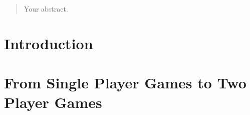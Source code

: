 \documentclass[12pt,twoside]{report}
\date{September 2017}
\begin{document}



\clearpage{\pagestyle{empty}\cleardoublepage}
\setcounter{page}{1}
\pagestyle{fancy}

\begin{abstract}
Your abstract.
\end{abstract}

\cleardoublepage

\clearpage{\pagestyle{empty}\cleardoublepage}

\tableofcontents 


\clearpage{\pagestyle{empty}\cleardoublepage}
\setcounter{page}{1}
\fancyhead[LE,RO]{\slshape \rightmark}
\fancyhead[LO,RE]{\slshape \leftmark}






\chapter{Introduction}






\chapter{From Single Player Games to Two Player Games}
\end{document}
